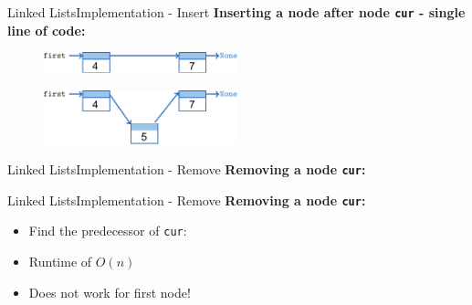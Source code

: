 \begin{frame}{Linked Lists}{Implementation - Insert}
  \textbf{Inserting a node after node \texttt{cur} - single line of code:}
  \begin{figure}
    \includegraphics[width=0.5\textwidth]{Images/LinkedList/insert-one-line-pre.pdf}
  \end{figure}
  \begin{figure}
    \includegraphics[width=0.5\textwidth]{Images/LinkedList/insert-one-line-post.pdf}
  \end{figure}
\end{frame}


\begin{frame}{Linked Lists}{Implementation - Remove}
  \textbf{Removing a node \texttt{cur}:}
  \begin{flushleft}
    
  \end{flushleft}
\end{frame}


\begin{frame}{Linked Lists}{Implementation - Remove}
  \textbf{Removing a node \texttt{cur}:}
  \begin{itemize}
    \item<2->
      Find the predecessor of \texttt{cur}:\\
      
    \item<3->
      Runtime of $O(n)$
    \item<4->
      Does not work for first node!
  \end{itemize}
  \vspace{-1.5em}
  \begin{flushleft}
    
  \end{flushleft}
\end{frame}


